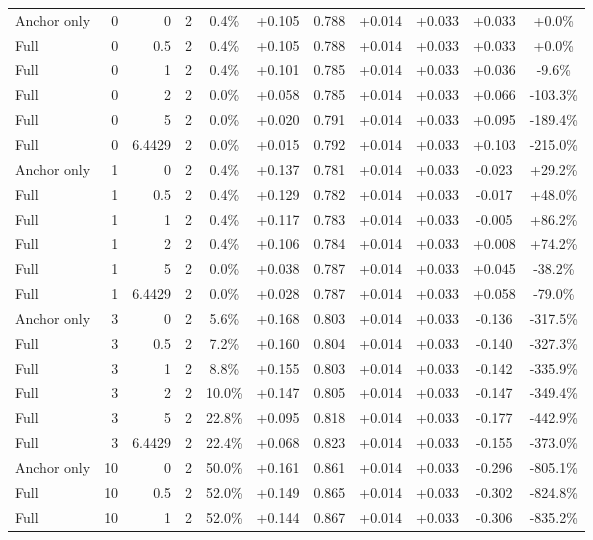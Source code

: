 \begin{table}[htbp]
\begin{tabular}{lrrrccccccc}
Anchor only & 0 & 0 & 2 & 0.4\% & +0.105 & 0.788 & +0.014 & +0.033 & +0.033 & +0.0\% \\
Full & 0 & 0.5 & 2 & 0.4\% & +0.105 & 0.788 & +0.014 & +0.033 & +0.033 & +0.0\% \\
Full & 0 & 1 & 2 & 0.4\% & +0.101 & 0.785 & +0.014 & +0.033 & +0.036 & -9.6\% \\
Full & 0 & 2 & 2 & 0.0\% & +0.058 & 0.785 & +0.014 & +0.033 & +0.066 & -103.3\% \\
Full & 0 & 5 & 2 & 0.0\% & +0.020 & 0.791 & +0.014 & +0.033 & +0.095 & -189.4\% \\
Full & 0 & 6.4429 & 2 & 0.0\% & +0.015 & 0.792 & +0.014 & +0.033 & +0.103 & -215.0\% \\
Anchor only & 1 & 0 & 2 & 0.4\% & +0.137 & 0.781 & +0.014 & +0.033 & -0.023 & +29.2\% \\
Full & 1 & 0.5 & 2 & 0.4\% & +0.129 & 0.782 & +0.014 & +0.033 & -0.017 & +48.0\% \\
Full & 1 & 1 & 2 & 0.4\% & +0.117 & 0.783 & +0.014 & +0.033 & -0.005 & +86.2\% \\
Full & 1 & 2 & 2 & 0.4\% & +0.106 & 0.784 & +0.014 & +0.033 & +0.008 & +74.2\% \\
Full & 1 & 5 & 2 & 0.0\% & +0.038 & 0.787 & +0.014 & +0.033 & +0.045 & -38.2\% \\
Full & 1 & 6.4429 & 2 & 0.0\% & +0.028 & 0.787 & +0.014 & +0.033 & +0.058 & -79.0\% \\
Anchor only & 3 & 0 & 2 & 5.6\% & +0.168 & 0.803 & +0.014 & +0.033 & -0.136 & -317.5\% \\
Full & 3 & 0.5 & 2 & 7.2\% & +0.160 & 0.804 & +0.014 & +0.033 & -0.140 & -327.3\% \\
Full & 3 & 1 & 2 & 8.8\% & +0.155 & 0.803 & +0.014 & +0.033 & -0.142 & -335.9\% \\
Full & 3 & 2 & 2 & 10.0\% & +0.147 & 0.805 & +0.014 & +0.033 & -0.147 & -349.4\% \\
Full & 3 & 5 & 2 & 22.8\% & +0.095 & 0.818 & +0.014 & +0.033 & -0.177 & -442.9\% \\
Full & 3 & 6.4429 & 2 & 22.4\% & +0.068 & 0.823 & +0.014 & +0.033 & -0.155 & -373.0\% \\
Anchor only & 10 & 0 & 2 & 50.0\% & +0.161 & 0.861 & +0.014 & +0.033 & -0.296 & -805.1\% \\
Full & 10 & 0.5 & 2 & 52.0\% & +0.149 & 0.865 & +0.014 & +0.033 & -0.302 & -824.8\% \\
Full & 10 & 1 & 2 & 52.0\% & +0.144 & 0.867 & +0.014 & +0.033 & -0.306 & -835.2\% \\

\end{tabular}
\end{table}
